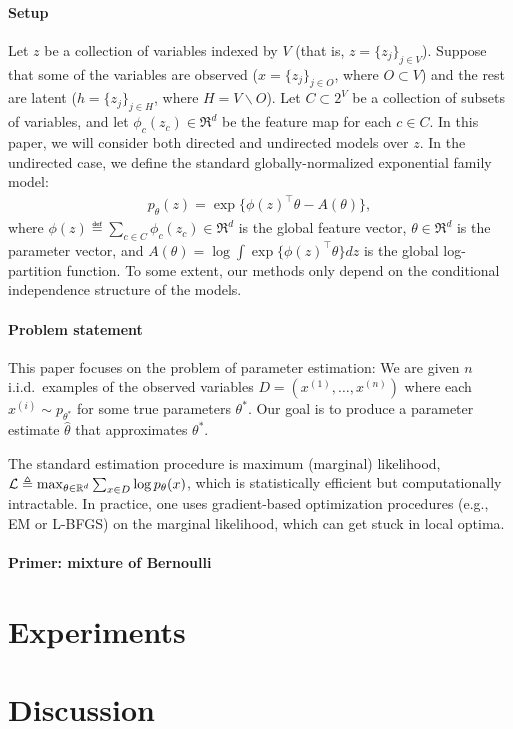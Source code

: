 \documentclass{article}
\begin{document}
\paragraph{Setup}
Let $z$ be a collection of variables indexed by $V$ (that is, $z = \{z_j\}_{j \in V}$).
Suppose that some of the variables are observed ($x = \{ z_j \}_{j \in O}$, where $O \subset V$) 
and the rest are latent ($h = \{ z_j \}_{j \in H}$, where $H = V \backslash O$).
Let $C \subset 2^V$ be a collection of subsets of variables,
and let $\phi_c(z_c) \in \Re^d$ be the feature map for each $c \in C$.
In this paper, we will consider both directed and undirected models over $z$.
In the undirected case, we define the standard globally-normalized exponential family model:
\begin{align}
  \label{eqn:undirectedSetup}
  p_\theta(z) = \exp\{ \phi(z)^\top\theta - A(\theta) \},
\end{align}
where $\phi(z) \eqdef \sum_{c \in C} \phi_c(z_c) \in \Re^d$ is the global feature vector, $\theta \in \Re^d$ is the parameter vector,
and $A(\theta) = \log \int \exp\{\phi(z)^\top\theta\} dz$ is the global log-partition function.
To some extent, our methods only depend on the conditional independence
structure of the models.

\paragraph{Problem statement}

This paper focuses on the problem of parameter estimation:
We are given $n$ i.i.d.~examples of the observed variables $D = (x^{(1)}, \dots, x^{(n)})$
where each $x^{(i)} \sim p_{\theta^*}$ for some true parameters $\theta^*$.
Our goal is to produce a parameter estimate $\hat\theta$ that approximates $\theta^*$.

The standard estimation procedure is maximum (marginal) likelihood,
$\mathcal{L} \triangleq \max_{\theta \in \mathbb{R}^d} \sum_{x \in D} \log p_\theta(x)$,
which is statistically efficient but computationally intractable.
In practice, one uses gradient-based optimization procedures (e.g., EM or L-BFGS)
on the marginal likelihood, which can get stuck in local optima.

\paragraph{Primer: mixture of Bernoulli}

\section{Experiments}
\label{sec:experiments}

\section{Discussion}
\label{sec:discussion}



\end{document}
